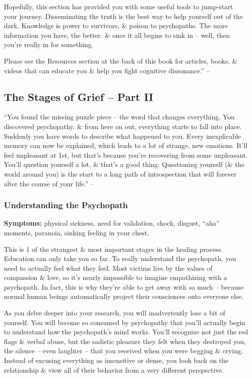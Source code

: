 \documentclass{article}
\numberwithin{equation}{section}
\begin{document}
Hopefully, this section has provided you with some useful tools to jump-start your journey. Disseminating the truth is the best way to help yourself out of the dark. Knowledge is power to survivors, \& poison to psychopaths. The more information you have, the better. \& once it all begins to sink in -- well, then you're really in for something.

Please see the Resources section at the back of this book for articles, books, \& videos that can educate you \& help you fight cognitive dissonance.'' -- \cite[pp. 107--111]{MacKenzie2015}

\subsection{The Stages of Grief -- Part II}
``You found the missing puzzle piece -- the word that changes everything. You discovered psychopathy. \& from here on out, everything starts to fall into place. Suddenly you have words to describe what happened to you. Every inexplicable memory can now be explained, which leads to a lot of strange, new emotions. It'll feel unpleasant at 1st, but that's because you're recovering from some unpleasant. You'll question yourself a lot, \& that's a good thing. Questioning yourself (\& the world around you) is the start to a long path of introspection that will forever alter the course of your life.'' -- \cite[p. 112]{MacKenzie2015}

\subsubsection{Understanding the Psychopath}
\textbf{Symptoms:} physical sickness, need for validation, shock, disgust, ``aha'' moments, paranoia, sinking feeling in your chest.

This is 1 of the strangest \& most important stages in the healing process. Education can only take you so far. To really understand the psychopath, you need to actually feel what they feel. Most victims live by the values of compassion \& love, so it's nearly impossible to imagine empathizing with a psychopath. In fact, this is why they're able to get away with so much -- because normal human beings automatically project their consciences onto everyone else.

As you delve deeper into your research, you will inadvertently lose a bit of yourself. You will become so consumed by psychopathy that you'll actually begin to understand how the psychopath's mind works. You'll recognize not just the red flags \& verbal abuse, but the sadistic pleasure they felt when they destroyed you, the silence -- even laughter -- that you received when you were begging \& crying. Instead of excusing everything as insensitive or dense, you look back on the relationship \& view all of their behavior from a very different perspective.
\end{document}
